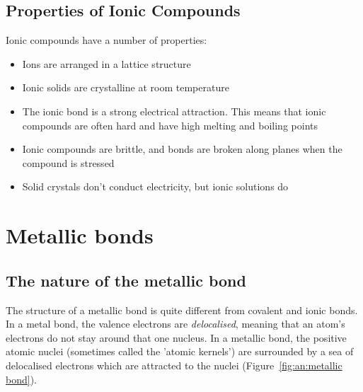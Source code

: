 \subsection{Properties of Ionic Compounds}
\label{subsec:bonding:ionic properties}

Ionic compounds have a number of properties:

\begin{itemize}
\item{Ions are arranged in a lattice structure}
\item{Ionic solids are crystalline at room temperature}
\item{The ionic bond is a strong electrical attraction. This means that ionic compounds are often hard and have high melting and boiling points}
\item{Ionic compounds are brittle, and bonds are broken along planes when the compound is stressed}
\item{Solid crystals don't conduct electricity, but ionic solutions do}
\end{itemize}







\section{Metallic bonds}

\subsection{The nature of the metallic bond}

The structure of a metallic bond is quite different from covalent and ionic bonds. In a metal bond, the valence electrons are \textit{delocalised}, meaning that an atom's electrons do not stay around that one nucleus. In a metallic bond, the positive atomic nuclei (sometimes called the 'atomic kernels') are surrounded by a sea of delocalised electrons which are attracted to the nuclei (Figure~\ref{fig:an:metallic bond}).


